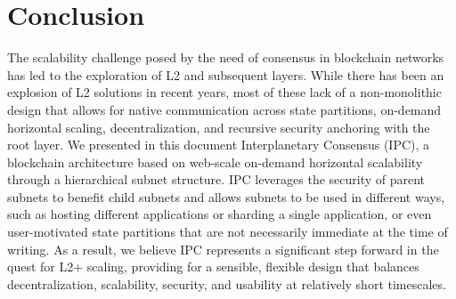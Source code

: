 \section{Conclusion}
The scalability challenge posed by the need of consensus in blockchain
networks has led to the exploration of L2 and subsequent layers. While there has been an
explosion of L2 solutions in recent years, most of these lack of a non-monolithic design that allows for
native communication across state partitions, on-demand horizontal
scaling, decentralization, and recursive security anchoring with the
root layer. We presented in this document Interplanetary Consensus (IPC), a blockchain architecture based on web-scale on-demand horizontal
scalability through a hierarchical subnet structure. IPC leverages the
security of parent subnets to benefit child subnets and allows subnets
to be used in different ways, such as hosting different applications
or sharding a single application, or even user-motivated state partitions that are not necessarily immediate at the time of writing. As a result, we believe IPC represents a significant step
forward in the quest for L2+ scaling, providing for a sensible, flexible design that balances decentralization,
scalability, security, and usability at relatively short timescales.